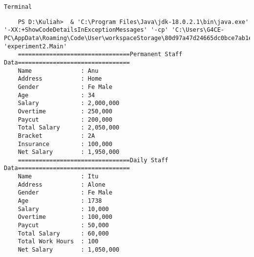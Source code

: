 \documentclass[12pt,titlepage]{article}
\begin{document}
\newpage

\texttt{Terminal}
\begin{verbatim}
    PS D:\Kuliah>  & 'C:\Program Files\Java\jdk-18.0.2.1\bin\java.exe' '-XX:+ShowCodeDetailsInExceptionMessages' '-cp' 'C:\Users\G4CE-PC\AppData\Roaming\Code\User\workspaceStorage\80d97a47d24665dc0bce7ab1e048ecbd\redhat.java\jdt_ws\Kuliah_28156aa7\bin' 'experiment2.Main'
    ================================Permanent Staff Data================================
    Name              : Anu      
    Address           : Home     
    Gender            : Fe Male  
    Age               : 34       
    Salary            : 2,000,000
    Overtime          : 250,000
    Paycut            : 200,000
    Total Salary      : 2,050,000
    Bracket           : 2A
    Insurance         : 100,000
    Net Salary        : 1,950,000
    ================================Daily Staff Data================================
    Name              : Itu
    Address           : Alone
    Gender            : Fe Male
    Age               : 1738
    Salary            : 10,000
    Overtime          : 100,000
    Paycut            : 50,000
    Total Salary      : 60,000
    Total Work Hours  : 100
    Net Salary        : 1,050,000
\end{verbatim}

\newpage
\end{document}
